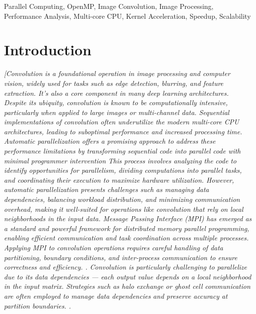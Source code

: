 \documentclass[conference, 10pt]{IEEEtran}
\begin{document}
\begin{IEEEkeywords}
Parallel Computing, OpenMP, Image Convolution, Image Processing, Performance Analysis, Multi-core CPU, Kernel Acceleration, Speedup, Scalability
\end{IEEEkeywords}


\section{Introduction}
\textit{{\color{blue} %
[Convolution is a foundational operation in image processing and computer vision, widely used for tasks such as edge detection, blurring, and feature extraction. It's also a core component in many deep learning architectures. 
Despite its ubiquity, convolution is known to be computationally intensive, particularly when applied to large images or multi-channel data. 
Sequential implementations of convolution often underutilize the modern multi-core CPU architectures, leading to suboptimal performance and increased processing time.
Automatic parallelization offers a promising approach to address these performance limitations by transforming sequential code into parallel code with minimal programmer intervention 
This process involves analyzing the code to identify opportunities for parallelism, dividing computations into parallel tasks, and coordinating their execution to maximize hardware utilization. 
However, automatic parallelization presents challenges such as managing data dependencies, balancing workload distribution, and minimizing communication overhead, making it well-suited for operations like convolution that rely on local neighborhoods in the input data.
Message Passing Interface (MPI) has emerged as a standard and powerful framework for distributed memory parallel programming, enabling efficient communication and task coordination across multiple processes. 
Applying MPI to convolution operations requires careful handling of data partitioning, boundary conditions, and inter-process communication to ensure correctness and efficiency. \cite{hager2021hpc}.
Convolution is particularly challenging to parallelize due to its data dependencies — each output value depends on a local neighborhood in the input matrix. 
Strategies such as halo exchange or ghost cell communication are often employed to manage data dependencies and preserve accuracy at partition boundaries. \cite{toth2016convolution}. 
}}
\end{document}
